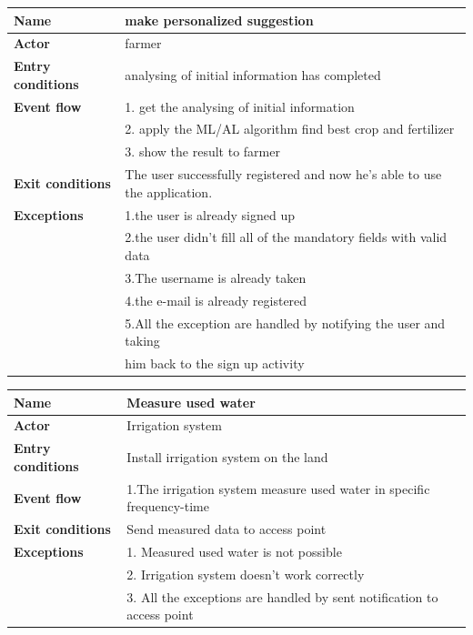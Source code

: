 \begin{table}[H]
\begin{tabular}{|l|l|}
\hline
\normalsize	
\textbf{Name} & make personalized suggestion\\\hline
\textbf{Actor} & farmer\\\hline
\textbf{Entry conditions} & analysing of initial information has completed\\\hline
\textbf{Event flow}  &  1. get the analysing of initial information \\ 
&2. apply the ML/AL algorithm find best crop and fertilizer\\
&3. show the result to farmer \\
\textbf{Exit conditions} & The user successfully registered and now he's able to use the application. \\\hline
\textbf{Exceptions }& 
1.the user is already signed up \\&
2.the user didn't fill all of the mandatory fields with valid data\\&
3.The username is already taken\\&
4.the e-mail is already registered\\&
5.All the exception are handled by notifying the user and taking\\& him back to the sign up activity
\\\hline
\end{tabular}
\end{table}

\begin{table}[H]
\begin{tabular}{|l|l|}
\hline
\normalsize	
\textbf{Name} & Measure used water\\\hline
\textbf{Actor} & Irrigation system\\\hline
\textbf{Entry conditions} & Install irrigation system on the land\\\hline
\textbf{Event flow}  &  1.The irrigation system measure used water in specific frequency-time\\\hline
\textbf{Exit conditions} & Send measured data to access point \\\hline
\textbf{Exceptions}& 
1. Measured used water is not possible \\&
2. Irrigation system doesn't work correctly\\&
3. All the exceptions are handled by sent notification to access point 
\\\hline
\end{tabular}
\end{table}


